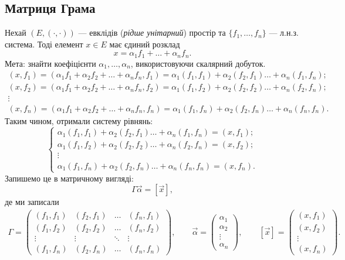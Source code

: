 \documentclass{math_library}
\begin{document}
\subsection{Матриця Грама}
Нехай $(E,(\cdot,\cdot))$ --- евклідів (\textit{рідше унітарний}) простір та $\{f_1,\dots,f_n\}$ --- л.н.з. система. Тоді елемент $x \in E$ має єдиний розклад
\[ 
x = \alpha_1 f_1 + \dots + \alpha_n f_n.
\]
Мета: знайти коефіцієнти $\alpha_1,\dots,\alpha_n$, використовуючи скалярний добуток.
\begin{align*}
(x,f_1) = (\alpha_1 f_1 + \alpha_2 f_2 + \dots + \alpha_n f_n, f_1) = \alpha_1 (f_1,f_1) + \alpha_2 (f_2,f_1) \dots + \alpha_n (f_1,f_n); \\
(x,f_2) = (\alpha_1 f_1 + \alpha_2 f_2 + \dots + \alpha_n f_n, f_2) = \alpha_1 (f_1,f_2) + \alpha_2 (f_2,f_2) \dots + \alpha_n (f_2,f_n); \\
\vdots \\
(x,f_n) = (\alpha_1 f_1 + \alpha_2 f_2 + \dots + \alpha_n f_n, f_n) = \alpha_1 (f_1,f_n) + \alpha_2 (f_2,f_n) \dots + \alpha_n (f_n,f_n).\end{align*}
Таким чином, отримали систему рівнянь:
\[
\begin{cases}
\alpha_1 (f_1,f_1) + \alpha_2 (f_2,f_1) \dots + \alpha_n (f_1,f_n) = (x,f_1); \\
\alpha_1 (f_1,f_2) + \alpha_2 (f_2,f_2) \dots + \alpha_n (f_2,f_n) = (x,f_2); \\
\vdots \\
\alpha_1 (f_1,f_n) + \alpha_2 (f_2,f_n) \dots + \alpha_n (f_n,f_n) = (x,f_n).
\end{cases}
\]
Запишемо це в матричному вигляді:
\[
\Gamma \vec{\alpha} = [\vec{x}],
\]
де ми записали
\begin{align*}
\Gamma = \begin{pmatrix}
(f_1,f_1) & (f_2,f_1) & \dots & (f_n,f_1) \\
(f_1,f_2) & (f_2,f_2) & \dots & (f_n,f_2) \\
\vdots & \vdots & \ddots & \vdots \\
(f_1,f_n) & (f_2,f_n) & \dots & (f_n,f_n)
\end{pmatrix}, \qquad
\vec{\alpha} = \begin{pmatrix}
\alpha_1 \\ \alpha_2 \\ \vdots \\ \alpha_n
\end{pmatrix}, \qquad
[\vec{x}] = \begin{pmatrix}
(x,f_1) \\ (x,f_2) \\ \vdots \\ (x,f_n)
\end{pmatrix}.
\end{align*}
\end{document}
